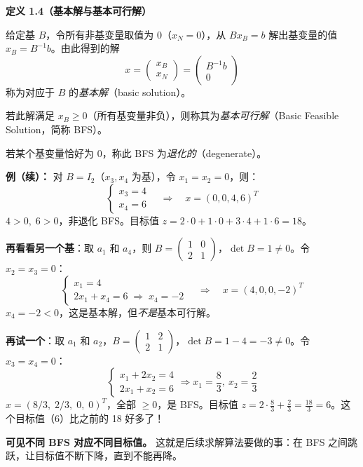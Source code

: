 \textbf{定义 1.4（基本解与基本可行解）}

给定基 $B$，令所有非基变量取值为 $0$（$x_N = 0$），从 $Bx_B = b$ 解出基变量的值 $x_B = B^{-1}b$。由此得到的解
\[
x = \begin{pmatrix}x_B \\ x_N\end{pmatrix} = \begin{pmatrix}B^{-1}b \\ 0\end{pmatrix}
\]
称为对应于 $B$ 的\emph{基本解}（basic solution）。

若此解满足 $x_B \ge 0$（所有基变量非负），则称其为\emph{基本可行解}（Basic Feasible Solution，简称 BFS）。

若某个基变量恰好为 0，称此 BFS 为\emph{退化的}（degenerate）。

\textbf{例（续）：} 对 $B=I_2$（$x_3,x_4$ 为基），令 $x_1=x_2=0$，则：
\[
\begin{cases}
x_3 = 4 \\
x_4 = 6
\end{cases}
\quad\Longrightarrow\quad x = (0,0,4,6)^T
\]
$4>0,\;6>0$，非退化 BFS。目标值 $z = 2\cdot 0 + 1\cdot 0 + 3\cdot 4 + 1\cdot 6 = 18$。

\textbf{再看看另一个基}：取 $a_1$ 和 $a_4$，则 $B=\begin{pmatrix}1&0\\2&1\end{pmatrix}$，$\det B=1\neq 0$。令 $x_2=x_3=0$：
{\small
\[
\begin{cases}
x_1 = 4 \\
2x_1 + x_4 = 6 \;\Rightarrow\; x_4 = -2
\end{cases}
\quad\Longrightarrow\quad x = (4,0,0,-2)^T
\]
}
$x_4=-2<0$，这是基本解，但\emph{不是}基本可行解。

\textbf{再试一个}：取 $a_1$ 和 $a_2$，$B=\begin{pmatrix}1&2\\2&1\end{pmatrix}$，$\det B = 1-4=-3\neq 0$。令 $x_3=x_4=0$：
\[
\begin{cases}
x_1+2x_2 = 4 \\
2x_1+x_2 = 6
\end{cases}
\Rightarrow x_1 = \frac{8}{3},\ x_2 = \frac{2}{3}
\]
$x=(8/3,\;2/3,\;0,\;0)^T$，全部 $\ge 0$，是 BFS。目标值 $z=2\cdot\frac{8}{3}+\frac{2}{3}=\frac{18}{3}=6$。这个目标值（6）比之前的 18 好多了！

\textbf{可见不同 BFS 对应不同目标值。} 这就是后续求解算法要做的事：在 BFS 之间跳跃，让目标值不断下降，直到不能再降。

